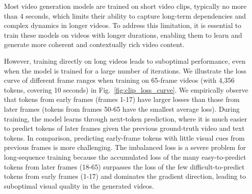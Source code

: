 Most video generation models are trained on short video clips, typically no more than 4 seconds, which limits their ability to capture long-term dependencies and complex dynamics in longer videos. To address this limitation, it is essential to train these models on videos with longer durations, enabling them to learn and generate more coherent and contextually rich video content.

However, training directly on long videos leads to suboptimal performance, even when the model is trained for a large number of iterations. We illustrate the loss curve of different frame ranges when training on 65-frame videos (with 4,356 tokens, covering 10 seconds) in Fig.~\ref{fig:clip_loss_curve}. We empirically observe that tokens from early frames (frames 1-17) have larger losses than those from later frames (tokens from frames 50-65 have the smallest average loss).
During training, the model learns through next-token prediction, where it is much easier to predict tokens of later frames given the previous ground-truth video and text tokens.
In comparison, predicting early-frame tokens with little visual cues from previous frames is more challenging. 
The imbalanced loss is a severe problem for long-sequence training because the accumulated loss of the many easy-to-predict tokens from later frames (18-65) surpasses the loss of the few difficult-to-predict tokens from early frames (1-17) and dominates the gradient direction, leading to suboptimal visual quality in the generated videos.


